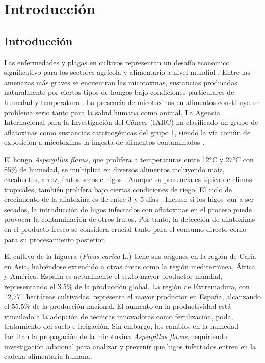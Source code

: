 \chapter{Introducción}
\section{Introducción}
Las enfermedades y plagas en cultivos representan un desafío económico significativo para los sectores agrícola y alimentario a nivel mundial \cite{CISTERNAS2020105626, agriengineering6040225}. Entre las amenazas más graves se encuentran las micotoxinas, sustancias producidas naturalmente por ciertos tipos de hongos bajo condiciones particulares de humedad y temperatura \cite{agriengineering6040225}. La presencia de micotoxinas en alimentos constituye un problema serio tanto para la salud humana como animal. La Agencia Internacional para la Investigación del Cáncer (IARC) ha clasificado un grupo de aflatoxinas como sustancias carcinogénicas del grupo 1, siendo la vía común de exposición a micotoxinas la ingesta de alimentos contaminados \cite{agriengineering6040225}.

\vspace{5mm}

El hongo \textit{Aspergillus flavus}, que prolifera a temperaturas entre 12°C y 27°C con 85\% de humedad, se multiplica en diversos alimentos incluyendo maíz, cacahuetes, arroz, frutos secos e higos \cite{agriengineering6040225}. Aunque su presencia es típica de climas tropicales, también prolifera bajo ciertas condiciones de riego. El ciclo de crecimiento de la aflatoxina es de entre 3 y 5 días \cite{agriengineering6040225}. Incluso si los higos van a ser secados, la introducción de higos infectados con aflatoxinas en el proceso puede provocar la contaminación de otros frutos. Por tanto, la detección de aflatoxinas en el producto fresco se considera crucial tanto para el consumo directo como para su procesamiento posterior.

\vspace{5mm}

El cultivo de la higuera (\textit{Ficus carica} L.) tiene sus orígenes en la región de Caria en Asia, habiéndose extendido a otras áreas como la región mediterránea, África y América. España es actualmente el sexto mayor productor mundial, representando el 3.5\% de la producción global. La región de Extremadura, con 12,771 hectáreas cultivadas, representa el mayor productor en España, alcanzando el 55.5\% de la producción nacional. El aumento en la productividad está vinculado a la adopción de técnicas innovadoras como fertilización, poda, tratamiento del suelo e irrigación. Sin embargo, los cambios en la humedad facilitan la propagación de la micotoxina \textit{Aspergillus flavus}, requiriendo investigación adicional para analizar y prevenir que higos infectados entren en la cadena alimentaria humana.

